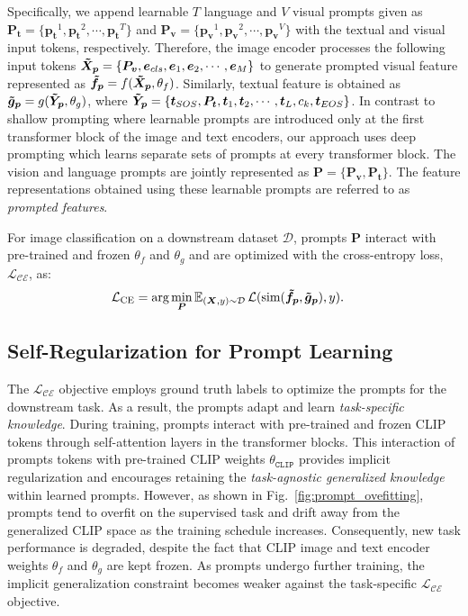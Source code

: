 \documentclass[10pt,twocolumn,letterpaper]{article}
\begin{document}
Specifically, we append learnable $T$ language and $V$ visual prompts given as $\bm{P_{t}} = \{\bm{p_t}^1,\bm{p_t}^2, \cdots, \bm{p_t}^T\}$ and $\bm{P_{v}} = \{\bm{p_v}^1,\bm{p_v}^2, \cdots, \bm{p_v}^V\}$ with the textual and visual input tokens, respectively. Therefore, the image encoder processes the following input tokens $\bm{\Tilde{X}_p}= \{ \bm{P_{v}}, \bm{e}_{cls}, \bm{e}_{1}, \bm{e}_{2}, \cdots, \bm{e}_{M}\}$ to generate prompted visual feature represented as $\bm{\Tilde{f}_p} = f(\bm{\Tilde{X}_p}, \theta_{f})$. Similarly, textual feature is obtained as $\bm{\Tilde{g}_p} = g(\bm{\Tilde{Y}_p}, \theta_{g})$, where $\bm{\Tilde{Y}_p}=\{\bm{t}_{SOS}, \bm{P_{t}} ,\bm{t}_{1}, \bm{t}_{2}, \cdots, \bm{t}_{L}, c_{k}, \bm{t}_{EOS}\}$. In contrast to shallow prompting where learnable prompts are introduced only at the first transformer block of the image and text encoders, our approach uses deep prompting which learns separate sets of prompts at every transformer block.   The vision and language  prompts are jointly represented as $ \bm{P} = \{ \bm{P_{v}}, \bm{P_{t}}\}$. The feature representations obtained using these learnable prompts are referred to as \emph{prompted features}. 

For image classification on a downstream dataset $\mathcal{D}$, prompts $\bm{P}$ interact with pre-trained and frozen $\theta_{f}$ and $\theta_{g}$ and are optimized with the cross-entropy loss, $\mathcal{L_{\text{CE}}}$, as:
\begin{align}
\label{eq:LCE}
    \mathcal{L_{\text{CE}}} = \text{arg}&\min_{\bm{P}}\mathbb{E}_{(\bm{X}, {y})\sim\mathcal{D}} \, \mathcal{L} (\text{sim}(\bm{\Tilde{f}_p},\bm{\Tilde{g}_p}), y).
\end{align}


\subsection{Self-Regularization for Prompt Learning}
\label{sec:meth:self_regularization_prompt_learning}

The $\mathcal{L_{\text{CE}}}$ objective employs ground truth labels to optimize the prompts for the downstream task.
As a result, the prompts adapt and learn \emph{task-specific knowledge}. During training, prompts interact with pre-trained and frozen CLIP tokens through self-attention layers in the transformer blocks. This interaction of prompts tokens with pre-trained CLIP weights ${\theta}_{\mathtt{CLIP}}$ provides implicit regularization and encourages retaining the \emph{task-agnostic generalized knowledge} within learned prompts.
However, as shown in Fig.~\ref{fig:prompt_ovefitting}, prompts tend to overfit on the supervised task and drift away from the generalized CLIP space as the training schedule increases. Consequently, new task performance is degraded, despite the fact that CLIP image and text encoder weights $\theta_{f}$ and $\theta_{g}$ are kept frozen. 
As prompts undergo further training, the implicit generalization constraint becomes weaker against the task-specific $\mathcal{L_{\text{CE}}}$ objective.
\end{document}
